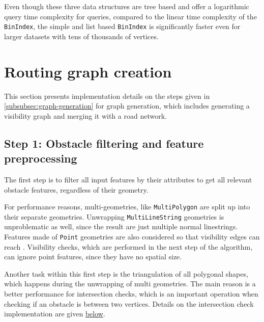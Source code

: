 		Even though these three data structures are tree based and offer a logarithmic query time complexity for queries, compared to the linear time complexity of the \texttt{BinIndex}, the simple and list based \texttt{BinIndex} is significantly faster even for larger datasets with tens of thousands of vertices.
		
\section{Routing graph creation}
\label{sec:visibility-graph-creation}
		
	This section presents implementation details on the steps given in \cref{subsubsec:graph-generation} for graph generation, which includes generating a visibility graph and merging it with a road network.

	\subsection{Step 1: Obstacle filtering and feature preprocessing}
	\label{subsec:step-1-preprocessing}
			
		The first step is to filter all input features by their attributes to get all relevant obstacle features, regardless of their geometry.
		
		For performance reasons, multi-geometries, like \texttt{MultiPolygon} are split up into their separate geometries.
		Unwrapping \texttt{MultiLineString} geometries is unproblematic as well, since the result are just multiple normal linestrings.
		Features made of \texttt{Point} geometries are also considered so that visibility edges can reach .
		Visibility checks, which are performed in the next step of the algorithm, can ignore point features, since they have no spatial size.
		
		Another task within this first step is the triangulation of all polygonal shapes, which happens during the unwrapping of multi geometries.
		The main reason is a better performance for intersection checks, which is an important operation when checking if an obstacle is between two vertices.
		Details on the intersection check implementation are given \hyperref[subsubsec:intersection-checks]{below}.
		
